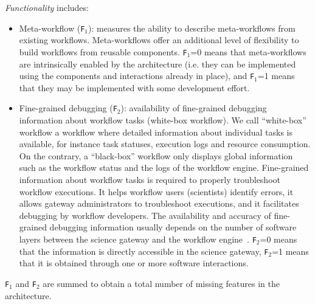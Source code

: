 \documentclass[preprint,3p,twocolumn]{elsarticle}
\newcommand{\correction}[1]{\color{blue}#1\color{black}\xspace}
\begin{document}
\correction{\emph{Functionality} includes}:
\begin{itemize}[leftmargin=0cm,itemindent=0.35cm,itemsep=0cm]
\item Meta-workflow (\texttt{\correction{F}$_1$}): measures the ability to describe
  meta-workflows from existing workflows. Meta-workflows offer an
  additional level of flexibility to build workflows from reusable
  components. \texttt{\correction{F}$_1$}=0 means that meta-workflows are
  intrinsically enabled by the architecture (i.e. they can be
  implemented using the components and interactions already in place),
  and \texttt{\correction{F}$_1$}=1 means that they may be implemented with some
  development effort.
  
\item Fine-grained debugging (\texttt{\correction{F}$_2$}): availability of
  fine-grained debugging information about workflow tasks (white-box
  workflow). \correction{We call ``white-box'' workflow a workflow
    where detailed information about individual tasks is available,
    for instance task statuses, execution logs and resource
    consumption. On the contrary, a ``black-box'' workflow only
    displays global information such as the workflow status and the
    logs of the workflow engine.} Fine-grained information about
  workflow tasks is required to properly troubleshoot workflow
  executions. \correction{It helps workflow users (scientists)
    identify errors, it allows gateway administrators to troubleshoot
    executions, and it facilitates debugging by workflow
    developers}. \correction{The availability and accuracy of
    fine-grained debugging information} usually depends on the number
  of software layers between the science gateway and the workflow
  engine~\cite{olabarriaga2014}. \texttt{\correction{F}$_2$}=0 means that the
  information is directly accessible in the science gateway,
  \texttt{\correction{F}$_2$}=1 means that it is obtained through one or more
  software interactions.
\end{itemize}
\texttt{\correction{F}$_1$} and \texttt{\correction{F}$_2$} are summed to obtain a total number of missing 
features in the architecture.


\end{document}
